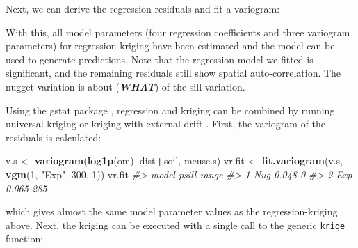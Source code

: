 \documentclass[11pt]{krantz}
\newenvironment{Shaded}{\begin{snugshade}}{\end{snugshade}}
\newcommand{\CommentTok}[1]{\textcolor[rgb]{0.37,0.37,0.37}{\textit{#1}}}
\newcommand{\DecValTok}[1]{\textcolor[rgb]{0.06,0.06,0.06}{#1}}
\newcommand{\KeywordTok}[1]{\textcolor[rgb]{0.27,0.27,0.27}{\textbf{#1}}}
\newcommand{\NormalTok}[1]{#1}
\newcommand{\OperatorTok}[1]{\textcolor[rgb]{0.43,0.43,0.43}{\textbf{#1}}}
\newcommand{\StringTok}[1]{\textcolor[rgb]{0.5,0.5,0.5}{#1}}
\theoremstyle{definition}
\theoremstyle{definition}
\theoremstyle{definition}
\theoremstyle{remark}
\begin{document}
Next, we can derive the regression residuals and fit a variogram:

\begin{Shaded}
\end{Shaded}

With this, all model parameters (four regression coefficients and three
variogram parameters) for regression-kriging have been estimated and the
model can be used to generate predictions. Note that the regression
model we fitted is significant, and the remaining residuals still show
spatial auto-correlation. The nugget variation is about
(\textbf{\emph{WHAT}}) of the sill variation.

Using the gstat package \citep{Pebesma2004CG, Bivand2013Springer},
regression and kriging can be combined by running universal kriging or
kriging with external drift \citep{hengl2007regression}. First, the
variogram of the residuals is calculated:

\begin{Shaded}
\begin{Highlighting}[]
\NormalTok{v.s <-}\StringTok{ }\KeywordTok{variogram}\NormalTok{(}\KeywordTok{log1p}\NormalTok{(om)}\OperatorTok{~}\NormalTok{dist}\OperatorTok{+}\NormalTok{soil, meuse.s)}
\NormalTok{vr.fit <-}\StringTok{ }\KeywordTok{fit.variogram}\NormalTok{(v.s, }\KeywordTok{vgm}\NormalTok{(}\DecValTok{1}\NormalTok{, }\StringTok{"Exp"}\NormalTok{, }\DecValTok{300}\NormalTok{, }\DecValTok{1}\NormalTok{))}
\NormalTok{vr.fit}
\CommentTok{#>   model psill range}
\CommentTok{#> 1   Nug 0.048     0}
\CommentTok{#> 2   Exp 0.065   285}
\end{Highlighting}
\end{Shaded}

which gives almost the same model parameter values as the
regression-kriging above. Next, the kriging can be executed with a
single call to the generic \texttt{krige} function:
\end{document}
